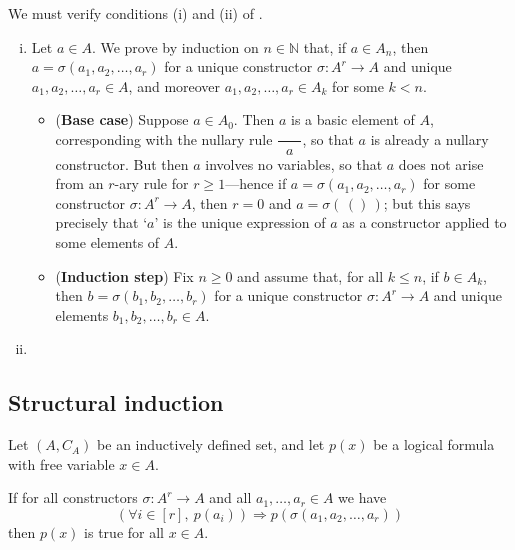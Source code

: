 \begin{cproof}
We must verify conditions (i) and (ii) of .
\begin{enumerate}[(i)]
\item Let $a \in A$. We prove by induction on $n \in \mathbb{N}$ that, if $a \in A_n$, then $a = \sigma(a_1,a_2,\dots,a_r)$ for a unique constructor $\sigma : A^r \to A$ and unique $a_1,a_2,\dots,a_r \in A$, and moreover $a_1,a_2,\dots,a_r \in A_k$ for some $k < n$.

\begin{itemize}
\item (\textbf{Base case}) Suppose $a \in A_0$. Then $a$ is a basic element of $A$, corresponding with the nullary rule $\dfrac{\hspace{20pt}}{a}$, so that $a$ is already a nullary constructor. But then $a$ involves no variables, so that $a$ does not arise from an $r$-ary rule for $r \ge 1$---hence if $a=\sigma(a_1,a_2,\dots,a_r)$ for some constructor $\sigma : A^r \to A$, then $r=0$ and $a = \sigma(\,()\,)$; but this says precisely that `$a$' is the unique expression of $a$ as a constructor applied to some elements of $A$.

\item (\textbf{Induction step}) Fix $n \ge 0$ and assume that, for all $k \le n$, if $b \in A_k$, then $b = \sigma(b_1,b_2,\dots,b_r)$ for a unique constructor $\sigma : A^r \to A$ and unique elements $b_1,b_2,\dots,b_r \in A$.

\end{itemize}

\item \todo{}
\end{enumerate}
\end{cproof}

\todo{}

\subsection*{Structural induction}

\todo{}

\begin{theorem}
\label{thmStructuralInduction}
Let $(A, C_A)$ be an inductively defined set, and let $p(x)$ be a logical formula with free variable $x \in A$.

If for all constructors $\sigma : A^r \to A$ and all $a_1,\dots,a_r \in A$ we have
\[ (\forall i \in [r],~p(a_i)) \Rightarrow p(\sigma(a_1,a_2,\dots,a_r)) \]
then $p(x)$ is true for all $x \in A$.
\end{theorem}

